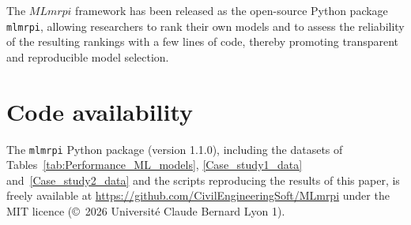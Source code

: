 The $MLmrpi$ framework has been released as the open-source Python package
\texttt{mlmrpi}, allowing researchers to rank their own models and to assess the
reliability of the resulting rankings with a few lines of code, thereby promoting
transparent and reproducible model selection.

\section*{Code availability}
The \texttt{mlmrpi} Python package (version 1.1.0), including the datasets of
Tables~\ref{tab:Performance_ML_models}, \ref{Case_study1_data} and~\ref{Case_study2_data}
and the scripts reproducing the results of this paper, is freely available at
\url{https://github.com/CivilEngineeringSoft/MLmrpi} under the MIT licence (\copyright~2026 Université Claude Bernard Lyon 1).

